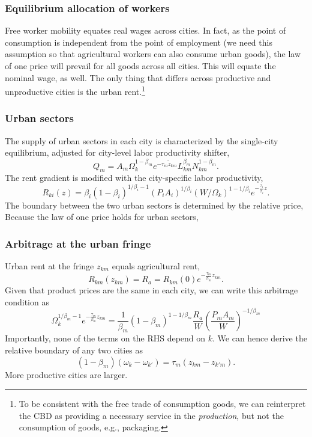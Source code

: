 \documentclass[12pt]{article}
\begin{document}
\subsubsection{Equilibrium allocation of workers}
Free worker mobility equates real wages across cities. In fact, as the point of consumption is independent from the point of employment (we need this assumption so that agricultural workers can also consume urban goods), the law of one price will prevail for all goods across all cities. This will equate the nominal wage, as well. The only thing that differs across productive and unproductive cities is the urban rent.\footnote{To be consistent with the free trade of consumption goods, we can reinterpret the CBD as providing a necessary service in the \emph{production}, but not the consumption of goods, e.g., packaging.}

\subsubsection{Urban sectors}
The supply of urban sectors in each city is characterized by the single-city equilibrium, adjusted for city-level labor productivity shifter,
\[
Q_m = A_m\Omega_k^{1-\beta_m}e^{-\tau_m\tilde z_{km}} 
L_{km}^{\beta_m}
N_{km}^{1-\beta_m}.
\]
The rent gradient is modified with the city-specific labor productivity,
\[
R_{ki}(z) =\beta_i(1-\beta_i)^{1/\beta_i-1} (P_iA_i)^{1/\beta_i} (W/\Omega_k)^{1-1/\beta_i} e^{-\frac{\tau_i}{\beta_i} z}.
\]
The boundary between the two urban sectors is determined by the relative price,
Because the law of one price holds for urban sectors, 
\subsubsection{Arbitrage at the urban fringe}
Urban rent at the fringe $z_{km}$ equals agricultural rent,
\[
R_{km}(z_{km}) = R_a = R_{km}(0)e^{-\frac{\tau_m}{\beta_m}z_{km}}.
\]
Given that product prices are the same in each city, we can write this arbitrage condition as
\[
\Omega_k^{1/\beta_m-1}e^{-\frac{\tau_m}{\beta_m}z_{km}}
=\frac1{\beta_m}
(1-\beta_m)^{1-1/\beta_m}
\frac{R_a}{W}
\left(
\frac{P_mA_m}{W}
\right)^{-1/\beta_m}
\]
Importantly, none of the terms on the RHS depend on $k$. We can hence derive the relative boundary of any two cities as
\[
(1-\beta_m)(\omega_{k} - \omega_{k'}) = 
\tau_m(z_{km} - z_{k'm}).
\]
More productive cities are larger.
\end{document}
